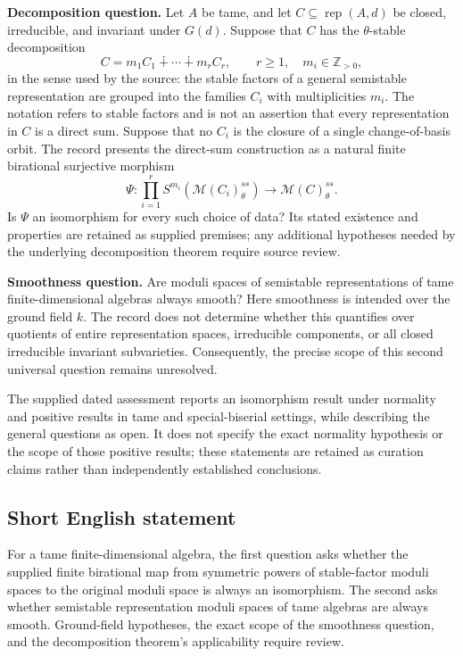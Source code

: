 \documentclass[11pt]{article}
\newcommand{\Z}{\mathbb{Z}}
\begin{document}
\textbf{Decomposition question.} Let \(A\) be tame, and let \(C\subseteq\operatorname{rep}(A,d)\) be closed, irreducible, and invariant under \(G(d)\). Suppose that \(C\) has the \(\theta\)-stable decomposition
\[
C=m_1C_1\dotplus\cdots\dotplus m_rC_r,
\qquad r\geq 1,\quad m_i\in\Z_{>0},
\]
in the sense used by the source: the stable factors of a general semistable representation are grouped into the families \(C_i\) with multiplicities \(m_i\). The notation refers to stable factors and is not an assertion that every representation in \(C\) is a direct sum. Suppose that no \(C_i\) is the closure of a single change-of-basis orbit. The record presents the direct-sum construction as a natural finite birational surjective morphism
\[
\Psi:\prod_{i=1}^r S^{m_i}\!\left(\mathcal M(C_i)_{\theta}^{ss}\right)
\longrightarrow \mathcal M(C)_{\theta}^{ss}.
\]
Is \(\Psi\) an isomorphism for every such choice of data? Its stated existence and properties are retained as supplied premises; any additional hypotheses needed by the underlying decomposition theorem require source review.

\textbf{Smoothness question.} Are moduli spaces of semistable representations of tame finite-dimensional algebras always smooth? Here smoothness is intended over the ground field \(k\). The record does not determine whether this quantifies over quotients of entire representation spaces, irreducible components, or all closed irreducible invariant subvarieties. Consequently, the precise scope of this second universal question remains unresolved.

The supplied dated assessment reports an isomorphism result under normality and positive results in tame and special-biserial settings, while describing the general questions as open. It does not specify the exact normality hypothesis or the scope of those positive results; these statements are retained as curation claims rather than independently established conclusions.
\subsection{Short English statement}
For a tame finite-dimensional algebra, the first question asks whether the supplied finite birational map from symmetric powers of stable-factor moduli spaces to the original moduli space is always an isomorphism. The second asks whether semistable representation moduli spaces of tame algebras are always smooth. Ground-field hypotheses, the exact scope of the smoothness question, and the decomposition theorem's applicability require review.
\end{document}
